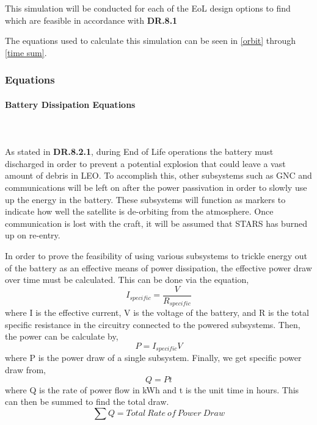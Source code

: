 This simulation will be conducted for each of the EoL design options to find which are feasible in accordance with \textbf{DR.8.1}

The equations used to calculate this simulation can be seen in \ref{orbit} through \ref{time sum}.

\subsubsection{Equations}
\paragraph{Battery Dissipation Equations} ~\\~\\
As stated in \textbf{DR.8.2.1}, during End of Life operations the battery must discharged in order to prevent a potential explosion that could leave a vast amount of debris in LEO. To accomplish this, other subsystems such as GNC and communications will be left on after the power passivation in order to slowly use up the energy in the battery. These subsystems will function as markers to indicate how well the satellite is de-orbiting from the atmosphere. Once communication is lost with the craft, it will be assumed that STARS has burned up on re-entry.

In order to prove the feasibility of using various subsystems to trickle energy out of the battery as an effective means of power dissipation, the effective power draw over time must be calculated. This can be done via the equation, 
\begin{equation}
    I_{specific} = \frac{V}{R_{specific}}
\end{equation}
where I is the effective current, V is the voltage of the battery, and R is the total specific resistance in the circuitry connected to the powered subsystems. Then, the power can be calculate by,
\begin{equation}
    P = I_{specific}V
\end{equation}
where P is the power draw of a single subsystem. Finally, we get specific power draw from,
\begin{equation}
    Q = Pt
\end{equation}
where Q is the rate of power flow in kWh and t is the unit time in hours. This can then be summed to find the total draw.
$$ \sum Q = Total \:Rate \:of \:Power \:Draw $$

